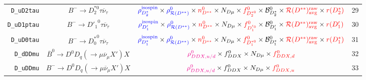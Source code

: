 \begin{landscape}
\begin{table}
\begin{tabular}{r|c|c|l}
       \texttt{D\_uD2tau} &                 $B^- \rightarrow D_2^{*0} \tau \overline{\nu}_\tau$                  &                        $\textcolor{blue}{\rho^\text{isospin}_{D_2^*}} \times \textcolor{blue}{\rho_{\mathcal{R}(D^{**})}^0} \times \textcolor{red}{n^{0}_{D^{**}}} \times N_{D \mu} \times \textcolor{red}{f^{0}_{D_2^{*0}}} \times \mathcal{B}^{0}_{D_2^*} \times \textcolor{red}{\mathcal{R}(D^{**})_\text{avg}^\text{raw}} \times \textcolor{red}{r({D_2^*})}$                        & 29               \\
      \texttt{D\_uD1ptau} &                 $B^- \rightarrow {D'_1}^0 \tau \overline{\nu}_\tau$                  &                         $\textcolor{blue}{\rho^\text{isospin}_{D'_1}} \times \textcolor{blue}{\rho_{\mathcal{R}(D^{**})}^0} \times \textcolor{red}{n^{0}_{D^{**}}} \times N_{D \mu} \times \textcolor{red}{f^{0}_{D_1^{'0}}} \times \mathcal{B}^{0}_{D'_1} \times \textcolor{red}{\mathcal{R}(D^{**})_\text{avg}^\text{raw}} \times \textcolor{red}{r({D'_1})}$                          & 30               \\
       \texttt{D\_uD0tau} &                 $B^- \rightarrow {D^*_0}^0 \tau \overline{\nu}_\tau$                 &                        $\textcolor{blue}{\rho^\text{isospin}_{D_1^*}} \times \textcolor{blue}{\rho_{\mathcal{R}(D^{**})}^0} \times \textcolor{red}{n^{0}_{D^{**}}} \times N_{D \mu} \times \textcolor{red}{f^{0}_{D_1^{*0}}} \times \mathcal{B}^{0}_{D_1^*} \times \textcolor{red}{\mathcal{R}(D^{**})_\text{avg}^\text{raw}} \times \textcolor{red}{r({D_1^*})}$                        & 31               \\
        \texttt{D\_dDDmu} &    $\overline{B}^0 \rightarrow D^0 D_q (\rightarrow \mu \overline{\nu}_\mu X') X$    &                                                                                                                                      $\textcolor{magenta}{\rho^0_{DDX,u/d}} \times f^0_{DDX} \times N_{D \mu} \times \textcolor{red}{f^0_{DDX,d}}$                                                                                                                                       & 32               \\
        \texttt{D\_uDDmu} &         $B^- \rightarrow D^0 D_q (\rightarrow \mu \overline{\nu}_\mu X') X$          &                                                                                                                                      $\textcolor{magenta}{\rho^0_{DDX,u/d}} \times f^0_{DDX} \times N_{D \mu} \times \textcolor{red}{f^0_{DDX,u}}$                                                                                                                                       & 33               \\

\end{tabular}
\end{table}
\end{landscape}
